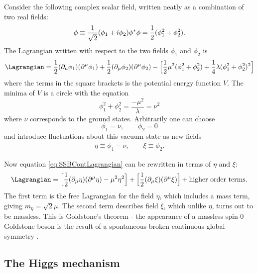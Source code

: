 Consider the following complex scalar field, written neatly as a combination of two real fields:
\begin{equation}
    \phi\equiv\dfrac{1}{\sqrt{2}}(\phi_1+i\phi_2)\\ \label{eq:complexfield}
    \phi^*\phi=\dfrac{1}{2}(\phi^2_1+\phi^2_2).
\end{equation}
The Lagrangian written with respect to the two fields $\phi_1$ and $\phi_2$ is
\begin{equation}\label{eq:SSBContLagrangian}
    \Lagrangian=\dfrac{1}{2}(\partial_{\mu}\phi_1)(\partial^{\mu}\phi_1) + \dfrac{1}{2}(\partial_{\mu}\phi_2)(\partial^{\mu}\phi_2) - \Big[\dfrac{1}{2}\mu^2(\phi_1^2+\phi_2^2)+\dfrac{1}{4}\lambda(\phi_1^2+\phi_2^2)^2\Big]
\end{equation}
where the terms in the square brackets is the potential energy function $V$. The minima of $V$ is a circle with the equation
\begin{equation}
    \phi_1^2+\phi_2^2=\dfrac{-\mu^2}{\lambda}=\nu^2
\end{equation}
where $\nu$ corresponds to the ground states. Arbitrarily one can choose
\begin{equation}
    \phi_1=\nu,\qquad\phi_2=0
\end{equation}
and introduce fluctuations about this vacuum state as new fields
\begin{align}\label{eq:etaxifields}
    \eta\equiv\phi_1-\nu,\qquad\xi\equiv\phi_2.
\end{align}

Now equation \ref{eq:SSBContLagrangian} can be rewritten in terms of $\eta$ and $\xi$:
\begin{equation}
    \Lagrangian=\Big[ \dfrac{1}{2}(\partial_{\mu}\eta)(\partial^{\mu}\eta) - \mu^2\eta^2 \Big] 
    + \Big[ \dfrac{1}{2}(\partial_{\mu}\xi)(\partial^{\mu}\xi) \Big] + \text{higher order terms.}
\end{equation}
The first term is the free Lagrangian for the field $\eta$, which includes a mass term, giving $m_{\eta}=\sqrt{2}\mu$. The second term describes field $\xi$, which unlike $\eta$, turns out to be massless. This is Goldstone's theorem - the appearance of a massless spin-0 Goldstone boson is the result of a spontaneous broken continuous global symmetry \cite{Griffiths:2008zz}. 

\subsection{The Higgs mechanism}

